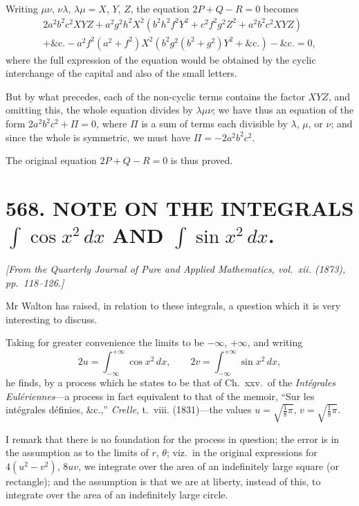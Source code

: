 \documentclass[11pt,a4paper]{article}
\theoremstyle{plain}
\theoremstyle{definition}
\theoremstyle{remark}
\newcommand{\paper}[2]{\section*{#1 #2}}
\newcommand{\papersource}[1]{\par\noindent\textit{#1}\par\medskip}
\begin{document}
\newpage

Writing $\mu\nu$, $\nu\lambda$, $\lambda\mu = X$, $Y$, $Z$, the equation $2P + Q - R = 0$ becomes
\begin{multline*}
2a^2b^2c^2 XYZ + a^2g^2h^2 X^2(b^2h^2f^2 Y^2 + c^2f^2g^2 Z^2 + a^2b^2c^2 XYZ) \\
+ \&\text{c.}
- a^2f^2(a^2+f^2)X^2(b^2g^2(b^2+g^2)Y^2 + \&\text{c.}) - \&\text{c.} = 0,
\end{multline*}
where the full expression of the equation would be obtained by the cyclic interchange of the capital and also of the small letters.

But by what precedes, each of the non-cyclic terms contains the factor $XYZ$, and omitting this, the whole equation divides by $\lambda\mu\nu$; we have thus an equation of the form $2a^2b^2c^2 + \Pi = 0$, where $\Pi$ is a sum of terms each divisible by $\lambda$, $\mu$, or $\nu$; and since the whole is symmetric, we must have $\Pi = -2a^2b^2c^2$.

The original equation $2P + Q - R = 0$ is thus proved.

\newpage
\paper{568.}{NOTE ON THE INTEGRALS $\displaystyle\int\cos x^2\,dx$ AND $\displaystyle\int\sin x^2\,dx$.}

\papersource{[From the Quarterly Journal of Pure and Applied Mathematics, vol.~xii. (1873), pp.~118--126.]}

Mr Walton has raised, in relation to these integrals, a question which it is very interesting to discuss.

Taking for greater convenience the limits to be $-\infty$, $+\infty$, and writing
\[
2u = \int_{-\infty}^{+\infty} \cos x^2\,dx, \qquad 2v = \int_{-\infty}^{+\infty} \sin x^2\,dx,
\]
he finds, by a process which he states to be that of Ch.~xxv.\ of the \textit{Int\'egrales Eul\'eriennes}---a process in fact equivalent to that of the memoir, ``Sur les int\'egrales d\'efinies, \&c.,'' \textit{Crelle}, t.~viii. (1831)---the values $u = \sqrt{\frac{1}{8}\pi}$, $v = \sqrt{\frac{1}{8}\pi}$.

I remark that there is no foundation for the process in question; the error is in the assumption as to the limits of $r$, $\theta$; viz.\ in the original expressions for $4(u^2 - v^2)$, $8uv$, we integrate over the area of an indefinitely large square (or rectangle); and the assumption is that we are at liberty, instead of this, to integrate over the area of an indefinitely large circle.
\end{document}
